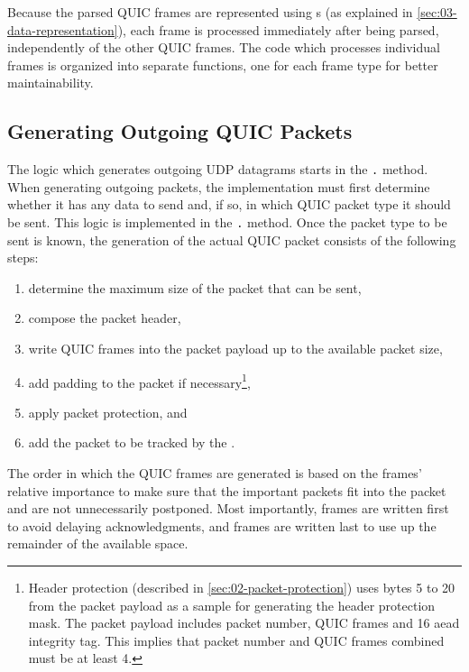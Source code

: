 Because the parsed QUIC frames are represented using s (as explained in
\autoref{sec:03-data-representation}), each frame is processed immediately after being parsed,
independently of the other QUIC frames. The code which processes individual frames is organized into
separate functions, one for each frame type for better maintainability.

\subsection{Generating Outgoing QUIC Packets}

The logic which generates outgoing UDP datagrams starts in the
\texttt{\ManagedQuicConnection{}.} method. When generating outgoing packets, the
implementation must first determine whether it has any data to send and, if so, in which QUIC packet
type it should be sent. This logic is implemented in the
\texttt{\ManagedQuicConnection{}.} method. Once the packet type to be sent is
known, the generation of the actual QUIC packet consists of the following steps:

\begin{enumerate}

  \item determine the maximum size of the packet that can be sent,

  \item compose the packet header,

  \item write QUIC frames into the packet payload up to the available packet size,

  \item add padding to the packet if necessary\footnote{Header protection (described in
\autoref{sec:02-packet-protection}) uses bytes 5 to 20 from the packet payload as a sample for
generating the header protection mask. The packet payload includes packet number, QUIC frames and
\SI{16}{\byte} \gls{aead} integrity tag. This implies that packet number and QUIC frames combined
must be at least \SI{4}{\byte}.},

  \item apply packet protection, and

  \item add the packet to be tracked by the \RecoveryController{}.

\end{enumerate}

The order in which the QUIC frames are generated is based on the frames' relative importance to make
sure that the important packets fit into the packet and are not unnecessarily postponed. Most
importantly, \ACK{} frames are written first to avoid delaying acknowledgments, and \STREAM{} frames
are written last to use up the remainder of the available space.


